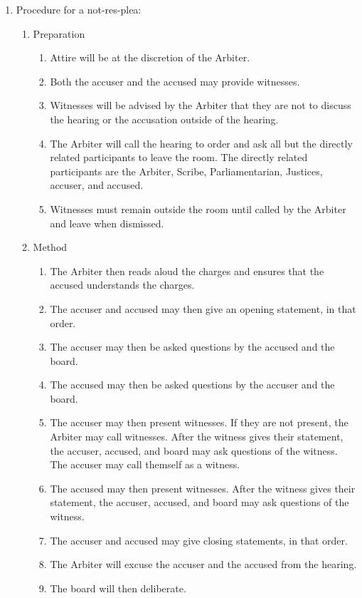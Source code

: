 \begin{enumerate}
		\item Procedure for a \gls{not-res-plea}:
			\begin{enumerate}
				\item Preparation
					\begin{enumerate}
						\item Attire will be at the discretion of the Arbiter.
						\item Both the accuser and the accused may provide witnesses.
						\item Witnesses will be advised by the Arbiter that they are not to discuss the hearing or the accusation outside of the hearing.
						\item The Arbiter will call the hearing to order and ask all but the directly related participants to leave the room. The directly related participants are the Arbiter, Scribe, Parliamentarian, Justices, accuser, and accused. 
						\item Witnesses must remain outside the room until called by the Arbiter and leave when dismissed.
					\end{enumerate}
				\item Method
					\begin{enumerate}
						\item The Arbiter then reads aloud the charges and ensures that the accused understands the charges.
						\item The accuser and accused may then give an opening statement, in that order.
						\item The accuser may then be asked questions by the accused and the board.
						\item The accused may then be asked questions by the accuser and the board.
						\item The accuser may then present witnesses. If they are not present, the Arbiter may call witnesses. After the witness gives their statement, the accuser, accused, and board may ask questions of the witness. The accuser may call themself as a witness.
						\item The accused may then present witnesses. After the witness gives their statement, the accuser, accused, and board may ask questions of the witness.
						\item The accuser and accused may give closing statements, in that order.
						\item The Arbiter will excuse the accuser and the accused from the hearing.
						\item The board will then deliberate.
							\begin{enumerate}

\end{enumerate}
\end{enumerate}
\end{enumerate}
\end{enumerate}
